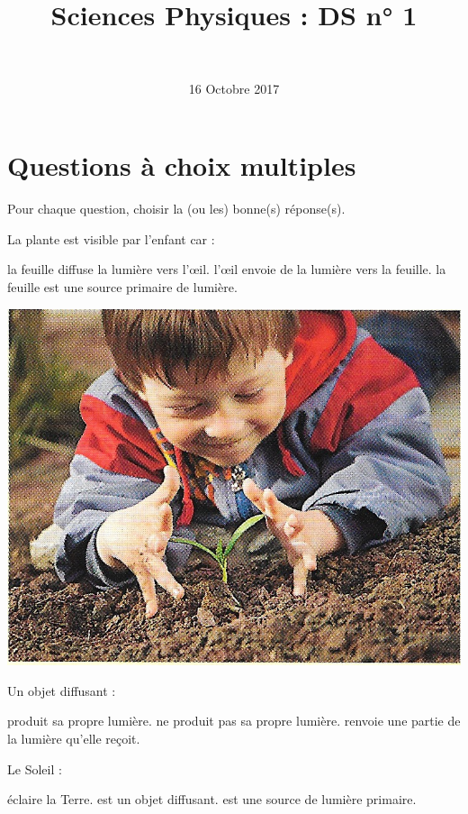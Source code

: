 \documentclass[a4paper,11pt]{exam}
\author{\ }
\date{16 Octobre 2017}
\title{Sciences Physiques : DS n° 1}
\begin{document}
%	

	\maketitle
\vspace*{-0.5cm}	
\section{Questions à choix multiples}
Pour chaque question, choisir la (ou les) bonne(s) réponse(s).

\begin{questions}
	\question La plante est visible par l'enfant car :
	\begin{multicols}{2}
		
		\begin{checkboxes}
			\choice la feuille diffuse la lumière vers l'\oe il.
			\choice l'\oe il envoie de la lumière vers la feuille.
			\choice la feuille est une source primaire de lumière.
		\end{checkboxes}
	
		\includegraphics[scale=0.2]{vision_herbe}
	\end{multicols}
	
	
	\question Un objet diffusant :
	
	\begin{checkboxes}
		\choice produit sa propre lumière.
		\choice ne produit pas sa propre lumière.
		\choice renvoie une partie de la lumière qu'elle reçoit.
	\end{checkboxes}

	\question Le Soleil :
	
	\begin{checkboxes}
		\choice éclaire la Terre.
		\choice est un objet diffusant.
		\choice est une source de lumière primaire.
	\end{checkboxes}


\end{questions}
\end{document}
